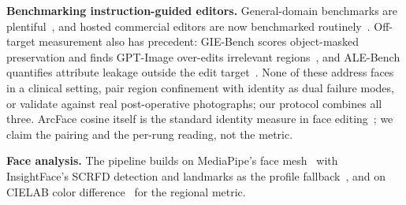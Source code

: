 \textbf{Benchmarking instruction-guided editors.} General-domain benchmarks are
plentiful~\cite{brooks2023instructpix2pix,zhang2023magicbrush,wang2023editbench,
sheynin2024emuedit,ku2024imagenhub,ma2024i2ebench,hui2025hqedit,liu2025step1xedit},
and hosted commercial editors are now benchmarked
routinely~\cite{gptimgeval2025,qian2025giebench}. Off-target measurement also has
precedent: GIE-Bench scores object-masked preservation and finds GPT-Image
over-edits irrelevant regions~\cite{qian2025giebench}, and ALE-Bench quantifies
attribute leakage outside the edit target~\cite{alebench2024}. None of these
address faces in a clinical setting, pair region confinement with identity as dual
failure modes, or validate against real post-operative photographs; our protocol
combines all three. ArcFace cosine itself is the standard identity
measure in face editing~\cite{deng2019arcface}; we claim the pairing and the
per-rung reading, not the metric.

\textbf{Face analysis.} The pipeline builds on MediaPipe's face
mesh~\cite{lugaresi2019mediapipe,grishchenko2020attentionmesh} with InsightFace's
SCRFD detection and landmarks as the profile fallback~\cite{guo2022scrfd}, and on
CIELAB color difference~\cite{sharma2005ciede2000} for the regional metric.
